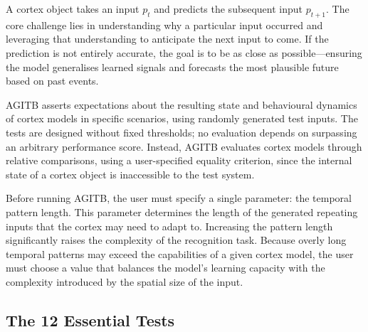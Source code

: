 \documentclass{article}
\begin{document}
A cortex object takes an input $p_t$ and predicts the subsequent input $p_{t+1}$. The core challenge lies in understanding why a particular input occurred and leveraging that understanding to anticipate the next input to come. If the prediction is not entirely accurate, the goal is to be as close as possible—ensuring the model generalises learned signals and forecasts the most plausible future based on past events.

AGITB asserts expectations about the resulting state and behavioural dynamics of cortex models in specific scenarios, using randomly generated test inputs. The tests are designed without fixed thresholds; no evaluation depends on surpassing an arbitrary performance score. Instead, AGITB evaluates cortex models through relative comparisons, using a user-specified equality criterion, since the internal state of a cortex object is inaccessible to the test system.

Before running AGITB, the user must specify a single parameter: the temporal pattern length. This parameter determines the length of the generated repeating inputs that the cortex may need to adapt to. Increasing the pattern length significantly raises the complexity of the recognition task. Because overly long temporal patterns may exceed the capabilities of a given cortex model, the user must choose a value that balances the model’s learning capacity with the complexity introduced by the spatial size of the input.

\subsection{The 12 Essential Tests}
\end{document}
